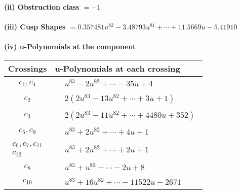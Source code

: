 \documentclass[1p]{elsarticle_modified}
\theoremstyle{definition}
\begin{document}
\flushleft \textbf{(ii) Obstruction class $= -1$}\\~\\
\flushleft \textbf{(iii) Cusp Shapes $= 0.357481 u^{82}-3.48793 u^{81}+\cdots+11.5669 u-5.41910$}\\~\\
\newpage\renewcommand{\arraystretch}{1}
\flushleft \textbf{(iv) u-Polynomials at the component}\newline \\
\begin{tabular}{m{50pt}|m{274pt}}
Crossings & \hspace{64pt}u-Polynomials at each crossing \\
\hline $$\begin{aligned}c_{1},c_{4}\end{aligned}$$&$\begin{aligned}
&u^{83}-2 u^{82}+\cdots-35 u+4
\end{aligned}$\\
\hline $$\begin{aligned}c_{2}\end{aligned}$$&$\begin{aligned}
&2(2 u^{83}-13 u^{82}+\cdots+3 u+1)
\end{aligned}$\\
\hline $$\begin{aligned}c_{3}\end{aligned}$$&$\begin{aligned}
&2(2 u^{83}-11 u^{82}+\cdots+4480 u+352)
\end{aligned}$\\
\hline $$\begin{aligned}c_{5},c_{9}\end{aligned}$$&$\begin{aligned}
&u^{83}+2 u^{82}+\cdots+4 u+1
\end{aligned}$\\
\hline $$\begin{aligned}c_{6},c_{7},c_{11}\\c_{12}\end{aligned}$$&$\begin{aligned}
&u^{83}+2 u^{82}+\cdots+2 u+1
\end{aligned}$\\
\hline $$\begin{aligned}c_{8}\end{aligned}$$&$\begin{aligned}
&u^{83}+u^{82}+\cdots-2 u+8
\end{aligned}$\\
\hline $$\begin{aligned}c_{10}\end{aligned}$$&$\begin{aligned}
&u^{83}+16 u^{82}+\cdots-11522 u-2671
\end{aligned}$\\
\hline
\end{tabular}\\~\\
\end{document}
